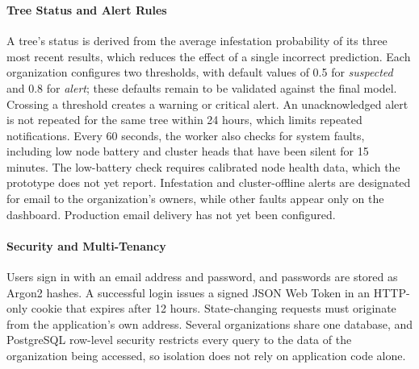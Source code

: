\subsubsection{}
\label{sec:nakhel_alerts_security}

\begingroup
\color{black}

\paragraph{Tree Status and Alert Rules}
A tree's status is derived from the average infestation probability of its three most recent results, which reduces the effect of a single incorrect prediction. Each organization configures two thresholds, with default values of 0.5 for \textit{suspected} and 0.8 for \textit{alert}; these defaults remain to be validated against the final model. Crossing a threshold creates a warning or critical alert. An unacknowledged alert is not repeated for the same tree within 24 hours, which limits repeated notifications. Every 60 seconds, the worker also checks for system faults, including low node battery and cluster heads that have been silent for 15 minutes. The low-battery check requires calibrated node health data, which the prototype does not yet report. Infestation and cluster-offline alerts are designated for email to the organization's owners, while other faults appear only on the dashboard. Production email delivery has not yet been configured.

\paragraph{Security and Multi-Tenancy}
Users sign in with an email address and password, and passwords are stored as Argon2 hashes. A successful login issues a signed JSON Web Token in an HTTP-only cookie that expires after 12 hours. State-changing requests must originate from the application's own address. Several organizations share one database, and PostgreSQL row-level security restricts every query to the data of the organization being accessed, so isolation does not rely on application code alone.

\endgroup
